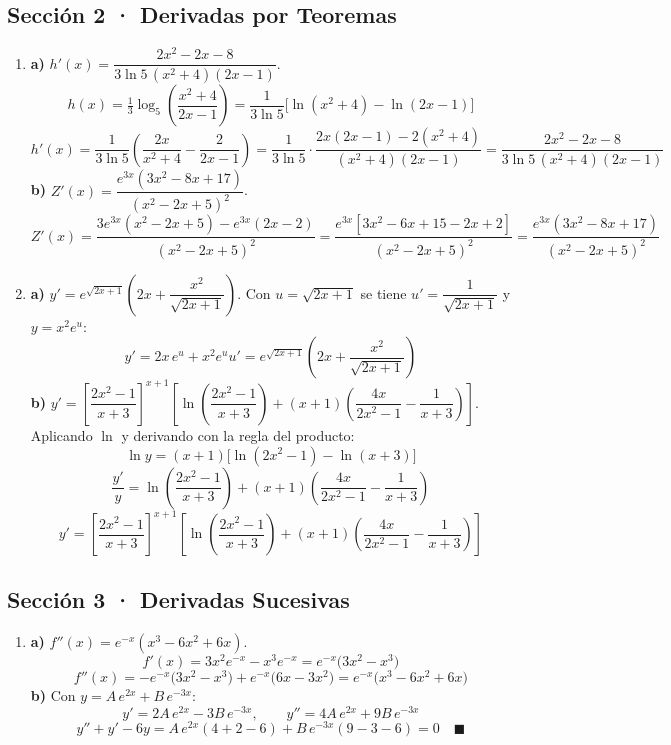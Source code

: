 \documentclass[12pt, letterpaper]{article}
\begin{document}
  \subsection*{Sección 2 · Derivadas por Teoremas}

  \begin{enumerate}[leftmargin=*, label=\textbf{\arabic*.}]
    \item
    \textbf{a)} $h'(x) = \dfrac{2x^{2}-2x-8}{3\ln 5\,(x^{2}+4)(2x-1)}$.
    \[
      h(x) = \tfrac{1}{3}\log_5\!\left(\frac{x^{2}+4}{2x-1}\right)
      = \frac{1}{3\ln 5}\Big[\ln(x^{2}+4) - \ln(2x-1)\Big]
    \]
    \[
      h'(x) = \frac{1}{3\ln 5}\left(\frac{2x}{x^{2}+4} - \frac{2}{2x-1}\right)
      = \frac{1}{3\ln 5}\cdot\frac{2x(2x-1) - 2(x^{2}+4)}{(x^{2}+4)(2x-1)}
      = \frac{2x^{2}-2x-8}{3\ln 5\,(x^{2}+4)(2x-1)}
    \]
    \textbf{b)} $Z'(x) = \dfrac{e^{3x}\left(3x^{2}-8x+17\right)}{(x^{2}-2x+5)^{2}}$.
    \[
      Z'(x) = \frac{3e^{3x}(x^{2}-2x+5) - e^{3x}(2x-2)}{(x^{2}-2x+5)^{2}}
      = \frac{e^{3x}\left[3x^{2}-6x+15-2x+2\right]}{(x^{2}-2x+5)^{2}}
      = \frac{e^{3x}\left(3x^{2}-8x+17\right)}{(x^{2}-2x+5)^{2}}
    \]

    \item
    \textbf{a)} $y' = e^{\sqrt{2x+1}}\left(2x + \dfrac{x^{2}}{\sqrt{2x+1}}\right)$.
    Con $u = \sqrt{2x+1}$ se tiene $u' = \dfrac{1}{\sqrt{2x+1}}$ y $y = x^{2}e^{u}$:
    \[
      y' = 2x\,e^{u} + x^{2}e^{u}u'
      = e^{\sqrt{2x+1}}\left(2x + \frac{x^{2}}{\sqrt{2x+1}}\right)
    \]
    \textbf{b)} $y' = \left[\dfrac{2x^{2}-1}{x+3}\right]^{x+1}
    \left[\ln\!\left(\dfrac{2x^{2}-1}{x+3}\right) + (x+1)\left(\dfrac{4x}{2x^{2}-1} - \dfrac{1}{x+3}\right)\right]$.
    Aplicando $\ln$ y derivando con la regla del producto:
    \[
      \ln y = (x+1)\Big[\ln(2x^{2}-1) - \ln(x+3)\Big]
    \]
    \[
      \frac{y'}{y} = \ln\!\left(\frac{2x^{2}-1}{x+3}\right) + (x+1)\left(\frac{4x}{2x^{2}-1} - \frac{1}{x+3}\right)
    \]
    \[
      y' = \left[\frac{2x^{2}-1}{x+3}\right]^{x+1}
      \left[\ln\!\left(\frac{2x^{2}-1}{x+3}\right) + (x+1)\left(\frac{4x}{2x^{2}-1} - \frac{1}{x+3}\right)\right]
    \]
  \end{enumerate}

  \subsection*{Sección 3 · Derivadas Sucesivas}

  \begin{enumerate}[leftmargin=*, label=\textbf{\arabic*.}]
    \item
    \textbf{a)} $f''(x) = e^{-x}\left(x^{3}-6x^{2}+6x\right)$.
    \[
      f'(x) = 3x^{2}e^{-x} - x^{3}e^{-x} = e^{-x}\big(3x^{2} - x^{3}\big)
    \]
    \[
      f''(x) = -e^{-x}\big(3x^{2}-x^{3}\big) + e^{-x}\big(6x - 3x^{2}\big)
      = e^{-x}\big(x^{3} - 6x^{2} + 6x\big)
    \]
    \textbf{b)} Con $y = A\,e^{2x} + B\,e^{-3x}$:
    \[
      y' = 2A\,e^{2x} - 3B\,e^{-3x},
      \qquad
      y'' = 4A\,e^{2x} + 9B\,e^{-3x}
    \]
    \[
      y'' + y' - 6y = A\,e^{2x}(4+2-6) + B\,e^{-3x}(9-3-6) = 0 \quad\blacksquare
    \]
  \end{enumerate}
\end{document}
